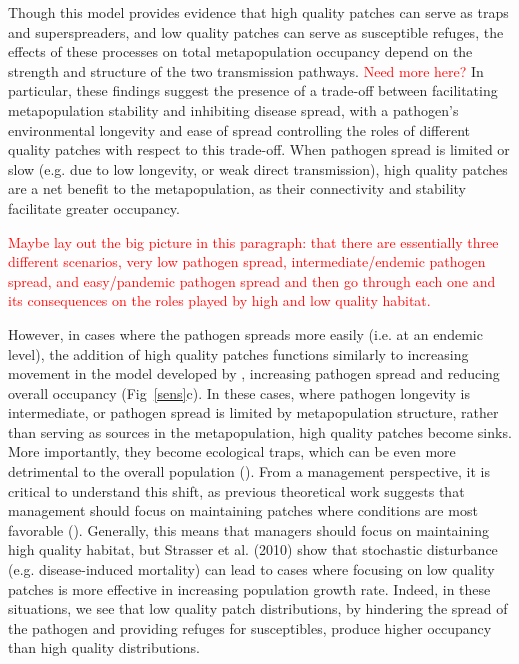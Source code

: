 \documentclass{svjour3}
\begin{document}
Though this model provides evidence that high quality patches can serve as traps and superspreaders, and low quality patches can serve as susceptible refuges, the effects of these processes on total metapopulation occupancy depend on the strength and structure of the two transmission pathways.  \textcolor{red}{Need more here?}  In particular, these findings suggest the presence of a trade-off between facilitating metapopulation stability and inhibiting disease spread, with a pathogen's environmental longevity and ease of spread controlling the roles of different quality patches with respect to this trade-off.  When pathogen spread is limited or slow (e.g. due to low longevity, or weak direct transmission), high quality patches are a net benefit to the metapopulation, as their connectivity and stability facilitate greater occupancy.  

\textcolor{red}{Maybe lay out the big picture in this paragraph: that there are essentially three different scenarios, very low pathogen spread, intermediate/endemic pathogen spread, and easy/pandemic pathogen spread and then go through each one and its consequences on the roles played by high and low quality habitat.}

However, in cases where the pathogen spreads more easily (i.e. at an endemic level), the addition of high quality patches functions similarly to increasing movement in the model developed by \cite{Hess1996}, increasing pathogen spread and reducing overall occupancy (Fig~\ref{sens}c).  In these cases, where pathogen longevity is intermediate, or pathogen spread is limited by metapopulation structure, rather than serving as sources in the metapopulation, high quality patches become sinks.  More importantly, they become ecological traps, which can be even more detrimental to the overall population (\cite{Kristan2003}).  From a management perspective, it is critical to understand this shift, as previous theoretical work suggests that management should focus on maintaining patches where conditions are most favorable (\cite{Strasser2010}).  Generally, this means that managers should focus on maintaining high quality habitat, but Strasser et al. (2010) show that stochastic disturbance (e.g. disease-induced mortality) can lead to cases where focusing on low quality patches is more effective in increasing population growth rate.  Indeed, in these situations, we see that low quality patch distributions, by hindering the spread of the pathogen and providing refuges for susceptibles, produce higher occupancy than high quality distributions.  
\end{document}
